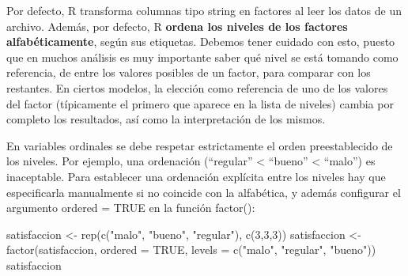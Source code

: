 \documentclass[
  letterpaper,
  DIV=11,
  numbers=noendperiod]{scrreprt}
\newenvironment{Shaded}{\begin{snugshade}}{\end{snugshade}}
\newcommand{\AttributeTok}[1]{\textcolor[rgb]{0.40,0.45,0.13}{#1}}
\newcommand{\ConstantTok}[1]{\textcolor[rgb]{0.56,0.35,0.01}{#1}}
\newcommand{\DecValTok}[1]{\textcolor[rgb]{0.68,0.00,0.00}{#1}}
\newcommand{\FunctionTok}[1]{\textcolor[rgb]{0.28,0.35,0.67}{#1}}
\newcommand{\NormalTok}[1]{\textcolor[rgb]{0.00,0.23,0.31}{#1}}
\newcommand{\OtherTok}[1]{\textcolor[rgb]{0.00,0.23,0.31}{#1}}
\newcommand{\StringTok}[1]{\textcolor[rgb]{0.13,0.47,0.30}{#1}}
\begin{document}
\begin{tcolorbox}[enhanced jigsaw, arc=.35mm, breakable, coltitle=black, left=2mm, opacityback=0, bottomtitle=1mm, colbacktitle=quarto-callout-warning-color!10!white, title=\textcolor{quarto-callout-warning-color}{\faExclamationTriangle}\hspace{0.5em}{R}, titlerule=0mm, colback=white, colframe=quarto-callout-warning-color-frame, bottomrule=.15mm, rightrule=.15mm, opacitybacktitle=0.6, toptitle=1mm, toprule=.15mm, leftrule=.75mm]

Por defecto, R transforma columnas tipo string en factores al leer los
datos de un archivo. Además, por defecto, R \textbf{ordena los niveles
de los factores alfabéticamente}, según sus etiquetas. Debemos tener
cuidado con esto, puesto que en muchos análisis es muy importante saber
qué nivel se está tomando como referencia, de entre los valores posibles
de un factor, para comparar con los restantes. En ciertos modelos, la
elección como referencia de uno de los valores del factor (típicamente
el primero que aparece en la lista de niveles) cambia por completo los
resultados, así como la interpretación de los mismos.

\end{tcolorbox}

En variables ordinales se debe respetar estrictamente el orden
preestablecido de los niveles. Por ejemplo, una ordenación (``regular''
\textless{} ``bueno'' \textless{} ``malo'') es inaceptable. Para
establecer una ordenación explícita entre los niveles hay que
especificarla manualmente si no coincide con la alfabética, y además
configurar el argumento ordered = TRUE en la función factor():

\begin{Shaded}
\begin{Highlighting}[]
\NormalTok{satisfaccion }\OtherTok{\textless{}{-}} \FunctionTok{rep}\NormalTok{(}\FunctionTok{c}\NormalTok{(}\StringTok{"malo"}\NormalTok{, }\StringTok{"bueno"}\NormalTok{, }\StringTok{"regular"}\NormalTok{), }\FunctionTok{c}\NormalTok{(}\DecValTok{3}\NormalTok{,}\DecValTok{3}\NormalTok{,}\DecValTok{3}\NormalTok{))}
\NormalTok{satisfaccion }\OtherTok{\textless{}{-}} \FunctionTok{factor}\NormalTok{(satisfaccion, }\AttributeTok{ordered =} \ConstantTok{TRUE}\NormalTok{, }\AttributeTok{levels =} \FunctionTok{c}\NormalTok{(}\StringTok{"malo"}\NormalTok{, }\StringTok{"regular"}\NormalTok{, }\StringTok{"bueno"}\NormalTok{))}
\NormalTok{satisfaccion}
\end{Highlighting}
\end{Shaded}
\end{document}
